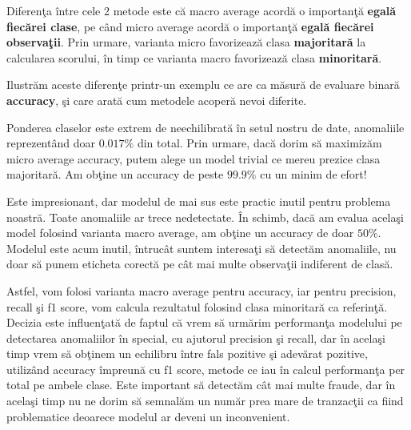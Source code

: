 Diferenţa între cele 2 metode este că macro average acordă o importanţă 
\textbf{egală fiecărei 
clase}, pe când micro average acordă o importanţă 
\textbf{egală fiecărei observaţii}. Prin urmare,
varianta micro favorizează clasa 
\textbf{majoritară} la calcularea scorului, în timp ce varianta 
macro favorizează clasa \textbf{minoritară}.

Ilustrăm aceste diferenţe printr-un exemplu ce are ca măsură de evaluare binară 
\textbf{accuracy},
şi care arată cum metodele acoperă nevoi diferite.

Ponderea claselor este extrem de neechilibrată în setul nostru de date, anomaliile 
reprezentând doar $0.017\%$ din total. Prin urmare, dacă dorim să maximizăm 
micro average accuracy, putem alege un model trivial ce mereu prezice clasa majoritară.
Am obţine un accuracy de peste $99.9\%$ cu un minim de efort!

Este impresionant, dar modelul de mai sus este practic inutil pentru problema noastră.
Toate anomaliile ar trece nedetectate. În schimb, dacă am evalua acelaşi model folosind
varianta macro average, am obţine un accuracy de doar $50\%$. Modelul este acum inutil,
întrucât suntem interesaţi să detectăm anomaliile, nu doar să punem eticheta corectă 
pe cât mai multe observaţii indiferent de clasă.

Astfel, vom folosi varianta macro average pentru accuracy, iar pentru precision, recall şi 
f1 score, vom calcula rezultatul folosind clasa minoritară ca referinţă. Decizia este influenţată
de faptul că vrem să urmărim performanţa modelului pe detectarea anomaliilor în special, cu ajutorul
precision şi recall, dar în acelaşi timp vrem să obţinem un echilibru între fals pozitive şi 
adevărat pozitive, utilizând accuracy împreună cu f1 score, metode ce iau în calcul performanţa 
per total pe ambele clase. Este important să detectăm cât mai multe fraude, dar în acelaşi timp 
nu ne dorim să semnalăm un număr prea mare de tranzacţii ca fiind problematice deoarece modelul 
ar deveni un inconvenient.